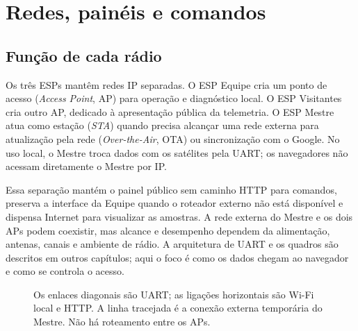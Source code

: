 \chapter{Redes, painéis e comandos}\label{cap:wifi-paineis}

\section{Função de cada rádio}
Os três ESPs mantêm redes IP separadas. O ESP Equipe cria um ponto de acesso (\emph{Access Point}, AP) para operação e diagnóstico local. O ESP Visitantes cria outro AP, dedicado à apresentação pública da telemetria. O ESP Mestre atua como estação (\emph{STA}) quando precisa alcançar uma rede externa para atualização pela rede (\emph{Over-the-Air}, OTA) ou sincronização com o Google. No uso local, o Mestre troca dados com os satélites pela UART; os navegadores não acessam diretamente o Mestre por IP.

Essa separação mantém o painel público sem caminho HTTP para comandos, preserva a interface da Equipe quando o roteador externo não está disponível e dispensa Internet para visualizar as amostras. A rede externa do Mestre e os dois APs podem coexistir, mas alcance e desempenho dependem da alimentação, antenas, canais e ambiente de rádio. A arquitetura de UART e os quadros são descritos em outros capítulos; aqui o foco é como os dados chegam ao navegador e como se controla o acesso.

\begin{figure}[htbp]\centering
{}
\caption{Os enlaces diagonais são UART; as ligações horizontais são Wi-Fi local e HTTP. A linha tracejada é a conexão externa temporária do Mestre. Não há roteamento entre os APs.}\label{fig:fluxo-web}
\end{figure}

